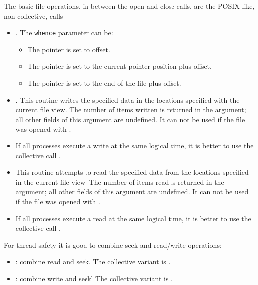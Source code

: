 The basic file operations, in between the open and close calls, are
the POSIX-like, non-collective, calls
\begin{itemize}
\item {}. The \lstinline{whence} parameter can be:
  \begin{itemize}
  \item {} The pointer is set to offset.
  \item {} The pointer is set to the current
    pointer position plus offset.
  \item {} The pointer is set to the end of
    the file plus offset.
  \end{itemize}
\item {}. This routine writes the specified data
  in the locations specified with the current file view. 
  The number of items written is returned in the  argument;
  all other fields of this argument are undefined.
  It can not be used if the file
  was opened with .
\item If all processes execute a write at the same logical time, it is
  better to use the collective call
  .
\item {} This routine attempts to read the specified data
  from the locations specified in the current file view. 
  The number of items read is returned in the  argument;
  all other fields of this argument are undefined.
  It can not be used if the file
  was opened with .
\item If all processes execute a read at the same logical time, it is
  better to use the collective call
  .
\end{itemize}

For thread safety it is good to combine seek and read/write operations:
\begin{itemize}
\item {}: combine read and seek.
  The collective variant is .
\item {}: combine write and seekl
  The collective variant is .
\end{itemize}

